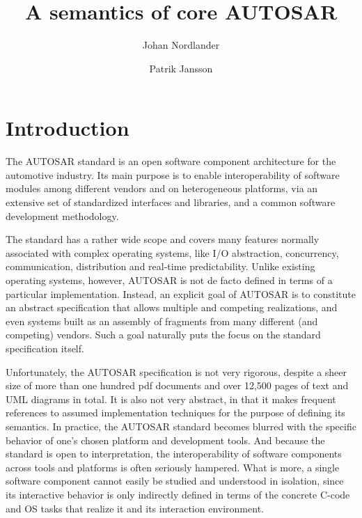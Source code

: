 \documentclass[twocolumn]{article}
\title{A semantics of core AUTOSAR}
\author{Johan Nordlander \and Patrik Jansson}
\begin{document}
\maketitle
\begin{abstract}


\end{abstract}

\section{Introduction}
\label{sec:Intro}

The AUTOSAR standard is an open software component architecture for the automotive industry. Its main purpose is to enable interoperability of software modules among different vendors and on heterogeneous platforms, via an extensive set of standardized interfaces and libraries, and a common software development methodology.

The standard has a rather wide scope and covers many features normally associated with complex operating systems, like I/O abstraction, concurrency, communication, distribution and real-time predictability. Unlike existing operating systems, however, AUTOSAR is not de facto defined in terms of a particular implementation. Instead, an explicit goal of AUTOSAR is to constitute an abstract specification that allows multiple and competing realizations, and even systems built as an assembly of fragments from many different (and competing) vendors. Such a goal naturally puts the focus on the standard specification itself.

Unfortunately, the AUTOSAR specification is not very rigorous, despite a sheer size of more than one hundred pdf documents and over 12,500 pages of text and UML diagrams in total. It is also not very abstract, in that it makes frequent references to assumed implementation techniques for the purpose of defining its semantics. In practice, the AUTOSAR standard becomes blurred with the specific behavior of one's chosen platform and development tools. And because the standard is open to interpretation, the interoperability of software components across tools and platforms is often seriously hampered. What is more, a single software component cannot easily be studied and understood in isolation, since its interactive behavior is only indirectly defined in terms of the concrete C-code and OS tasks that realize it and its interaction environment.
\end{document}
